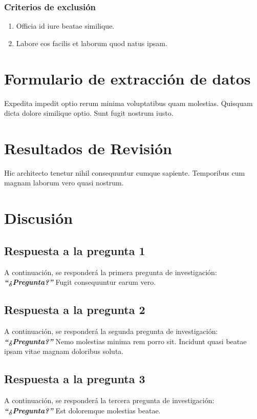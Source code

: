 \subsubsection*{Criterios de exclusión}
\begin{enumerate}[label=CE.\arabic*.]
    \item Officia id iure beatae similique.
    \item Labore eos facilis et laborum quod natus ipsam.
\end{enumerate}

\section{Formulario de extracción de datos}
Expedita impedit optio rerum minima voluptatibus quam molestias. Quisquam dicta dolore similique optio. Sunt fugit nostrum iusto.

\section{Resultados de Revisión}
Hic architecto tenetur nihil consequuntur cumque sapiente. Temporibus cum magnam laborum vero quasi nostrum.

\section{Discusión}
\subsection{Respuesta a la pregunta 1}
A continuación, se responderá la primera pregunta de investigación: \textbf{\textit{``¿Pregunta?''}}\newline
Fugit consequuntur earum vero.

\subsection{Respuesta a la pregunta 2}
A continuación, se responderá la segunda pregunta de investigación: \textbf{\textit{``¿Pregunta?''}}\newline
Nemo molestias minima rem porro sit. Incidunt quasi beatae ipsam vitae magnam doloribus soluta.

\subsection{Respuesta a la pregunta 3}
A continuación, se responderá la tercera pregunta de investigación: \textbf{\textit{``¿Pregunta?''}}\newline
Est doloremque molestias beatae.

